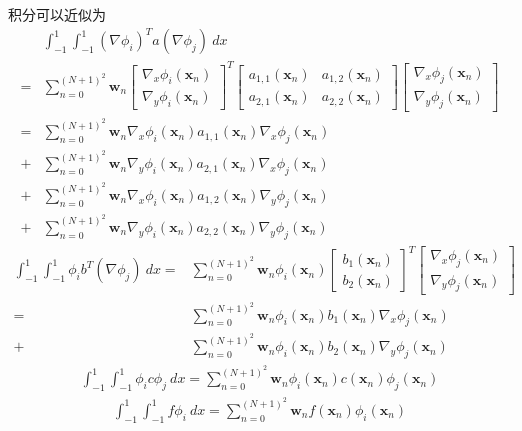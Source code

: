 \documentclass[12pt,a4paper]{article}
\begin{document}
积分可以近似为
\begin{align*}
& \int_{-1}^{1} \int_{-1}^{1} (\nabla \phi_{i})^T a (\nabla \phi_{j}) \ dx \\
= & \sum_{n = 0}^{(N+1)^2} \mathbf{w}_n
\left[
\begin{array}{c}
\nabla_x \phi_i(\mathbf{x}_n) \\
\nabla_y \phi_i(\mathbf{x}_n)
\end{array}
\right]^T
\left[
\begin{array}{cc}
a_{1,1}(\mathbf{x}_n) & a_{1,2}(\mathbf{x}_n) \\
a_{2,1}(\mathbf{x}_n) & a_{2,2}(\mathbf{x}_n)
\end{array}
\right]
\left[
\begin{array}{c}
\nabla_x \phi_j(\mathbf{x}_n) \\
\nabla_y \phi_j(\mathbf{x}_n)
\end{array}
\right] \\
= & \sum_{n = 0}^{(N+1)^2} \mathbf{w}_n \nabla_x \phi_i(\mathbf{x}_n) a_{1,1}(\mathbf{x}_n) \nabla_x \phi_j(\mathbf{x}_n) \\
+ & \sum_{n = 0}^{(N+1)^2} \mathbf{w}_n \nabla_y \phi_i(\mathbf{x}_n) a_{2,1}(\mathbf{x}_n) \nabla_x \phi_j(\mathbf{x}_n) \\
+ & \sum_{n = 0}^{(N+1)^2} \mathbf{w}_n \nabla_x \phi_i(\mathbf{x}_n) a_{1,2}(\mathbf{x}_n) \nabla_y \phi_j(\mathbf{x}_n) \\
+ & \sum_{n = 0}^{(N+1)^2} \mathbf{w}_n \nabla_y \phi_i(\mathbf{x}_n) a_{2,2}(\mathbf{x}_n) \nabla_y \phi_j(\mathbf{x}_n)
\end{align*}
\begin{align*}
\int_{-1}^{1} \int_{-1}^{1} \phi_{i} b^T (\nabla \phi_{j}) \ dx = & \sum_{n = 0}^{(N+1)^2} \mathbf{w}_n \phi_{i}(\mathbf{x}_n)
\left[
\begin{array}{c}
b_{1}(\mathbf{x}_n) \\
b_{2}(\mathbf{x}_n)
\end{array}
\right]^T
\left[
\begin{array}{c}
\nabla_x \phi_j(\mathbf{x}_n) \\
\nabla_y \phi_j(\mathbf{x}_n)
\end{array}
\right] \\
= & \sum_{n = 0}^{(N+1)^2} \mathbf{w}_n \phi_i(\mathbf{x}_n) b_1(\mathbf{x}_n) \nabla_x \phi_j(\mathbf{x}_n) \\
+ & \sum_{n = 0}^{(N+1)^2} \mathbf{w}_n \phi_i(\mathbf{x}_n) b_2(\mathbf{x}_n) \nabla_y \phi_j(\mathbf{x}_n)
\end{align*}
\begin{align*}
\int_{-1}^{1} \int_{-1}^{1} \phi_{i} c \phi_{j} \ dx = \sum_{n = 0}^{(N+1)^2} \mathbf{w}_n \phi_{i}(\mathbf{x}_n) c(\mathbf{x}_n) \phi_{j}(\mathbf{x}_n)
\end{align*}
\begin{align*}
\int_{-1}^{1} \int_{-1}^{1} f \phi_{i} \ dx = \sum_{n = 0}^{(N+1)^2} \mathbf{w}_n f(\mathbf{x}_n) \phi_{i}(\mathbf{x}_n)
\end{align*}
\end{document}
